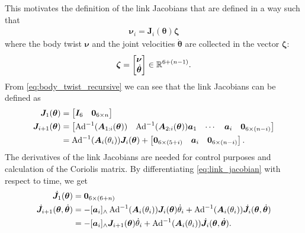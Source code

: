 This motivates the definition of the link Jacobians that are defined in a way
such that
\begin{align}
    \bm{\nu}_{i} = \bm{J}_i(\bm{\theta}) \bm{\zeta}
\end{align}
where the body twist $\bm{\nu}$ and the joint velocities $\dot{\bm{\theta}}$ are
collected in the vector $\bm{\zeta}$:
\begin{align}
    \bm{\zeta} = \begin{bmatrix}\bm{\nu} \\ \dot{\bm{\theta}}\end{bmatrix} \in \mathbb{R}^{6+(n-1)}.
\end{align}
From \autoref{eq:body_twist_recursive} we can see that the link Jacobians can be
defined as
\begin{subequations}
    \label{eq:link_jacobian}
\begin{align}
    \bm{J}_1(\bm{\theta}) &= \begin{bmatrix} \bm{I}_6 & \bm{0}_{6 \times n} \end{bmatrix} \\
        \bm{J}_{i+1}(\bm{\theta}) &= \begin{bmatrix}
            \operatorname{Ad}^{-1}(\bm{A}_{1:i}(\bm{\theta}))  &  \operatorname{Ad}^{-1}(\bm{A}_{2:i}(\bm{\theta})) \bm{a}_1 &
            \cdots & \bm{a}_i & \bm{0}_{6 \times (n-i)}
        \end{bmatrix} \\
    &= \operatorname{Ad}^{-1}(\bm{A}_i(\theta_i)) \bm{J}_i(\bm{\theta}) + \begin{bmatrix}
        \bm{0}_{6 \times (5+i)} & \bm{a}_i & \bm{0}_{6 \times (n-i)}
    \end{bmatrix}.
\end{align}
\end{subequations}
The derivatives of the link Jacobians are needed for control purposes and
calculation of the Coriolis matrix. By differentiating \autoref{eq:link_jacobian}
with respect to time, we get
\begin{subequations}
\begin{align}
    \dot{\bm{J}}_1(\bm{\theta}) &= \bm{0}_{6\times(6+n)} \\
    \dot{\bm{J}}_{i+1}(\bm{\theta},\dot{\bm{\theta}}) &= -[\bm{a}_i]_{\wedge} \operatorname{Ad}^{-1}(\bm{A}_i(\theta_i))
        \bm{J}_i(\bm{\theta})\dot{\theta}_i + \operatorname{Ad}^{-1}(\bm{A}_i(\theta_i))\dot{\bm{J}}_i(\bm{\theta},\dot{\bm{\theta}}) \\
    &= -[\bm{a}_i]_{\wedge}\bm{J}_{i+1}(\bm{\theta})\dot{\theta}_i +
        \operatorname{Ad}^{-1}(\bm{A}_i(\theta_i))\dot{\bm{J}}_i(\bm{\theta},\dot{\bm{\theta}}).
\end{align}
\end{subequations}

